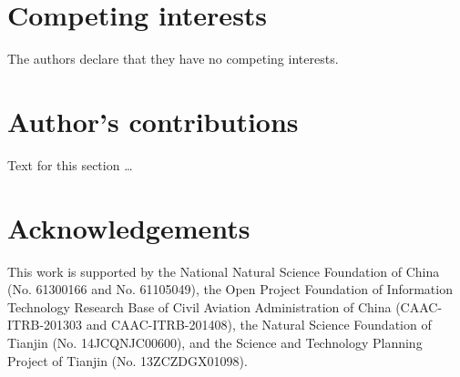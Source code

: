 \documentclass{bmcart}
\begin{document}

\begin{backmatter}

\section*{Competing interests}
  The authors declare that they have no competing interests.

\section*{Author's contributions}
    Text for this section \ldots

\section*{Acknowledgements}
This work is supported by the National Natural Science Foundation of China (No. 61300166 and No. 61105049), the Open Project Foundation of Information Technology Research Base of Civil Aviation Administration of China (CAAC-ITRB-201303 and CAAC-ITRB-201408), the Natural Science Foundation of Tianjin (No. 14JCQNJC00600), and the Science and Technology Planning Project of Tianjin (No. 13ZCZDGX01098).




\end{backmatter}
\end{document}

